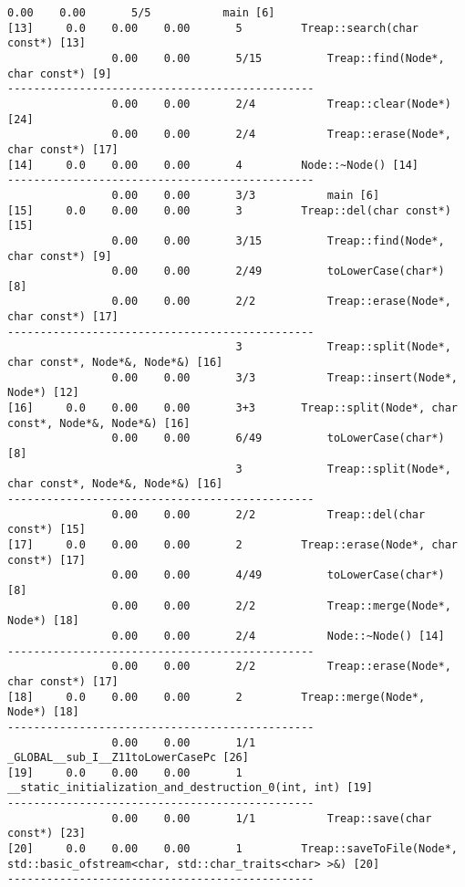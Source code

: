 \documentclass[12pt]{article}
\begin{document}
\begin{lstlisting}[breaklines]
                0.00    0.00       5/5           main [6]
[13]     0.0    0.00    0.00       5         Treap::search(char const*) [13]
                0.00    0.00       5/15          Treap::find(Node*, char const*) [9]
-----------------------------------------------
                0.00    0.00       2/4           Treap::clear(Node*) [24]
                0.00    0.00       2/4           Treap::erase(Node*, char const*) [17]
[14]     0.0    0.00    0.00       4         Node::~Node() [14]
-----------------------------------------------
                0.00    0.00       3/3           main [6]
[15]     0.0    0.00    0.00       3         Treap::del(char const*) [15]
                0.00    0.00       3/15          Treap::find(Node*, char const*) [9]
                0.00    0.00       2/49          toLowerCase(char*) [8]
                0.00    0.00       2/2           Treap::erase(Node*, char const*) [17]
-----------------------------------------------
                                   3             Treap::split(Node*, char const*, Node*&, Node*&) [16]
                0.00    0.00       3/3           Treap::insert(Node*, Node*) [12]
[16]     0.0    0.00    0.00       3+3       Treap::split(Node*, char const*, Node*&, Node*&) [16]
                0.00    0.00       6/49          toLowerCase(char*) [8]
                                   3             Treap::split(Node*, char const*, Node*&, Node*&) [16]
-----------------------------------------------
                0.00    0.00       2/2           Treap::del(char const*) [15]
[17]     0.0    0.00    0.00       2         Treap::erase(Node*, char const*) [17]
                0.00    0.00       4/49          toLowerCase(char*) [8]
                0.00    0.00       2/2           Treap::merge(Node*, Node*) [18]
                0.00    0.00       2/4           Node::~Node() [14]
-----------------------------------------------
                0.00    0.00       2/2           Treap::erase(Node*, char const*) [17]
[18]     0.0    0.00    0.00       2         Treap::merge(Node*, Node*) [18]
-----------------------------------------------
                0.00    0.00       1/1           _GLOBAL__sub_I__Z11toLowerCasePc [26]
[19]     0.0    0.00    0.00       1         __static_initialization_and_destruction_0(int, int) [19]
-----------------------------------------------
                0.00    0.00       1/1           Treap::save(char const*) [23]
[20]     0.0    0.00    0.00       1         Treap::saveToFile(Node*, std::basic_ofstream<char, std::char_traits<char> >&) [20]
-----------------------------------------------

\end{lstlisting}
\end{document}
